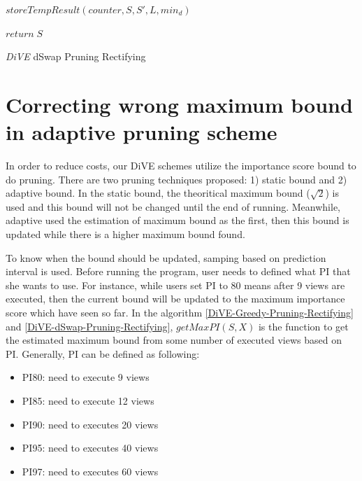 \documentclass{article}
\begin{document}
\begin{algorithm}
{{			
		}{
		
			$ storeTempResult(counter, S, S', L, min_d)$\;



}
	

	
		
	}
	$return\; S$
	\caption{\textit{DiVE} dSwap Pruning Rectifying}\label{DiVE-dSwap-Pruning-Rectifying}
\end{algorithm}




\section{Correcting wrong maximum bound in adaptive pruning scheme}


In order to reduce costs, our DiVE schemes utilize the importance score bound to do pruning. There are two pruning techniques proposed: 1) static bound and 2) adaptive bound. In the static bound, the theoritical maximum bound ($ \sqrt{2} $) is used and this bound will not be changed until the end of running. Meanwhile, adaptive used the estimation of maximum bound as the first, then this bound is updated while there is a higher maximum bound found. 


To know when the bound should be updated, samping based on prediction interval is used. Before running the program, user needs to defined what PI that she wants to use. For instance, while users set PI to 80 means after 9 views are executed, then the current bound will be updated to the maximum importance score which have seen so far. In the algorithm \ref{DiVE-Greedy-Pruning-Rectifying} and \ref{DiVE-dSwap-Pruning-Rectifying}, $getMaxPI(S,X)$ is the function to get the estimated maximum bound from some number of executed views based on PI. Generally, PI can be defined as following: 

\begin{itemize}[noitemsep]
	\item PI80: need to execute 9 views
	\item PI85: need to execute 12 views
	\item PI90: need to executes 20 views
	\item PI95: need to executes 40 views
	\item PI97: need to executes 60 views
\end{itemize}
\end{document}
